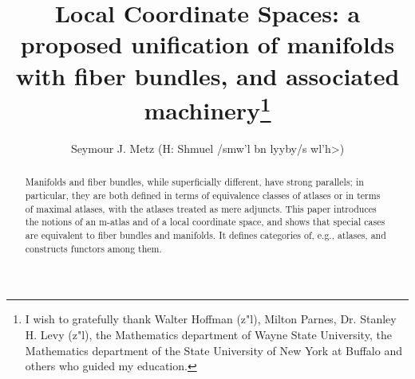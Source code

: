 \documentclass{article}
\begin{document}

\title%
{%
  Local Coordinate Spaces:
  a proposed unification of manifolds with fiber bundles,
  and associated machinery\thanks%
  {
  I wish to gratefully thank Walter Hoffman (z"l),
  Milton Parnes, Dr. Stanley H. Levy (z"l), the Mathematics department of
  Wayne State University, the Mathematics department of the State
  University of New York at Buffalo and others who guided my education.
  }
}
\author{Seymour J. Metz (H: Shmuel \</smw'l bn lyyby/s wl'h>)
}
\maketitle




\begin{abstract}
Manifolds and fiber bundles, while superficially different, have strong
parallels; in particular, they are both defined in terms of equivalence
classes of atlases or in terms of maximal atlases, with the atlases
treated as mere adjuncts.  This paper introduces the notions of an
m-atlas and of a local coordinate space, and shows that special cases
are equivalent to fiber bundles and manifolds. It defines categories of,
e.g., atlases, and constructs functors among them.
\end{abstract}

\setupset   {}

\end{document}
